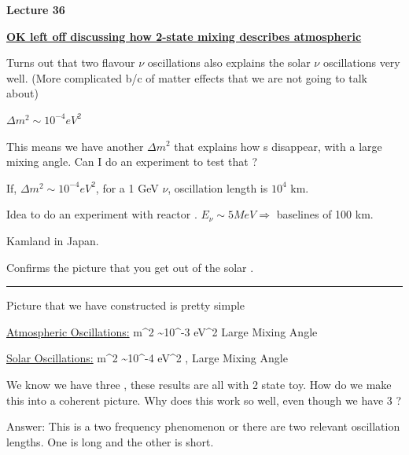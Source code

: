 \usepackage{fancyhdr}

\fancyhf{}


\thispagestyle{fancy}

\begin{center}
{\huge \textbf{Lecture 36}}
\end{center}

{\fontsize{14}{16}\selectfont

\textbf{\underline{OK left off discussing how 2-state mixing describes atmospheric \nus}} 

Turns out that two flavour $\nu$ oscillations also explains the solar $\nu$ oscillations very well. 
(More complicated b/c of matter effects that we are not going to talk about)

$\Delta m^2 \sim 10^{-4} eV^2$ 

This means we have another $\Delta m^2$ that explains how \nue s disappear, with a large mixing angle. 
Can I do an experiment to test that ?

If,  $\Delta m^2 \sim 10^{-4} eV^2$,  for a 1 GeV $\nu$, oscillation length is $10^4$ km. 

Idea to do an experiment with reactor \nus.
$E_\nu \sim 5 MeV \Rightarrow $ baselines of 100 km. 

Kamland in Japan.

Confirms the picture that you get out of the solar \nus.

\noindent\rule{\textwidth}{1pt}

Picture that we have constructed is pretty simple

\underline{Atmospheric Oscillations:}
\be
\Delta m^2 \sim 10^{-3} eV^2
\ee
\be
\numu \longleftrightarrow \nutau
\ee
\bc
Large Mixing Angle
\ec

\underline{Solar Oscillations:}
\be
\Delta m^2 \sim 10^{-4} eV^2
\ee
\be
\nue \longleftrightarrow \numu,\nutau
\ee
\bc
Large Mixing Angle
\ec

We know we have three \nus, these results are all with 2 state toy. 
How do we make this into a coherent picture. 
Why does this work so well, even though we have 3 \nus?

Answer:
This is a two frequency phenomenon or there are two relevant oscillation lengths.
One is long and the other is short. 

}
